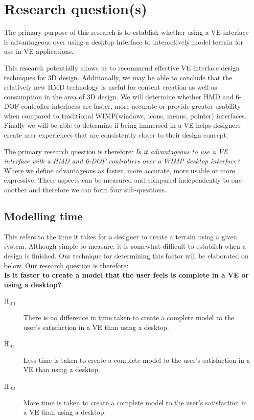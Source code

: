 \documentclass{sig-alternate-05-2015}
\begin{document}
\section{Research question(s)}
The primary purpose of this research is to establish whether using a VE interface is advantageous over using a desktop interface to interactively model terrain for use in VE applications.

This research potentially allows us to recommend effective VE interface design techniques for 3D design. Additionally, we may be able to conclude that the relatively new HMD technology is useful for content creation as well as consumption in the area of 3D design. We will determine whether HMD and 6-DOF controller interfaces are faster, more accurate or provide greater usability when compared to traditional WIMP(windows, icons, menus, pointer) interfaces. Finally we will be able to determine if being immersed in a VE helps designers create user experiences that are consistently closer to their design concept.

The primary research question is therefore: \textit{Is it advantageous to use a VE interface with a HMD and 6-DOF controllers over a WIMP desktop interface?}
Where we define advantageous as faster, more accurate, more usable or more expressive. These aspects can be measured and compared independently to one another and therefore we can form four sub-questions.
\subsection{Modelling time}
This refers to the time it takes for a designer to create a terrain using a given system. Although simple to measure, it is somewhat difficult to establish when a design is finished. Our technique for determining this factor will be elaborated on below. Our research question is therefore:\\
\textbf{Is it faster to create a model that the user feels is complete in a VE or using a desktop?}\\
\begin{description}
	\item [H$_{A0}$] There is no difference in time taken to create a complete model to the user's satisfaction in a VE than using a desktop.
	\item [H$_{A1}$] Less time  is taken to create a complete model to the user's satisfaction in a VE than using a desktop.
	\item [H$_{A2}$] More time  is taken to create a complete model to the user's satisfaction in a VE than using a desktop.
\end{description}
\end{document}
